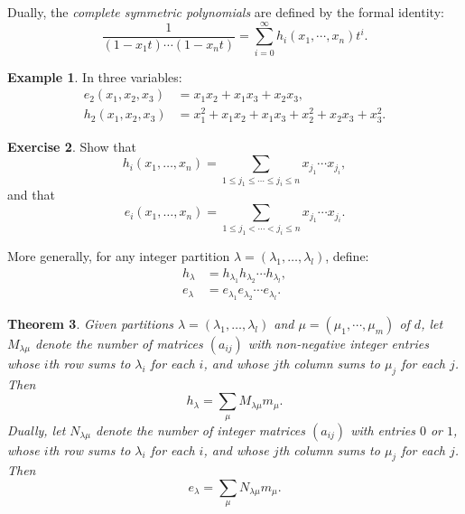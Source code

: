 \documentclass[11pt]{amsproc}
\newtheorem{theorem}{Theorem}[subsection]
\theoremstyle{definition}
\theoremstyle{example}
\newtheorem{example}[theorem]{Example}
\newtheorem{exercise}[theorem]{Exercise}
\begin{document}
Dually, the \emph{complete symmetric polynomials} are defined by the formal identity:
\begin{displaymath}
  \frac 1{(1-x_1t)\dotsb (1-x_nt)} = \sum_{i=0}^\infty h_i(x_1,\dotsb, x_n)t^i.
\end{displaymath}
\begin{example}
  In three variables:
  \begin{align*}
    e_2(x_1,x_2,x_3) & = x_1x_2 + x_1x_3 + x_2x_3,\\
    h_2(x_1,x_2,x_3) & = x_1^2 + x_1x_2 + x_1x_3 + x_2^2 + x_2x_3 + x_3^2.
  \end{align*}
\end{example}
\begin{exercise}
  Show that
  \begin{displaymath}
    h_i(x_1,\dotsc, x_n) = \sum_{1\leq j_1\leq \dotsb \leq j_i\leq n} x_{j_1}\dotsb x_{j_i},
  \end{displaymath}
  and that
  \begin{displaymath}
    e_i(x_1,\dotsc, x_n) = \sum_{1\leq j_1< \dotsb < j_i\leq n} x_{j_1}\dotsb x_{j_i}.
  \end{displaymath}
\end{exercise}
More generally, for any integer partition $\lambda=(\lambda_1,\dotsc, \lambda_l)$, define:
\begin{align*}
  h_\lambda &= h_{\lambda_1} h_{\lambda_2}\dotsb h_{\lambda_l},\\
  e_\lambda &= e_{\lambda_1} e_{\lambda_2}\dotsb e_{\lambda_l}.
\end{align*}
\begin{theorem}
  Given partitions $\lambda=(\lambda_1,\dotsc,\lambda_l)$ and $\mu=(\mu_1,\dotsb, \mu_m)$ of $d$, let $M_{\lambda\mu}$ denote the number of matrices $(a_{ij})$ with non-negative integer entries whose $i$th row sums to $\lambda_i$ for each $i$, and whose $j$th column sums to $\mu_j$ for each $j$.
  Then
  \begin{displaymath}
    h_\lambda = \sum_\mu M_{\lambda\mu} m_\mu.
  \end{displaymath}
  Dually, let $N_{\lambda\mu}$ denote the number of integer matrices $(a_{ij})$ with entries $0$ or $1$, whose $i$th row sums to $\lambda_i$ for each $i$, and whose $j$th column sums to $\mu_j$ for each $j$.
  Then
  \begin{displaymath}
    e_\lambda = \sum_\mu N_{\lambda\mu} m_\mu.
  \end{displaymath}
\end{theorem}
\end{document}
